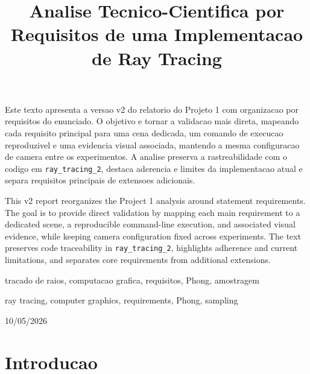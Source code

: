 \documentclass[portuguese]{sbcreviews-2025}%
\title[Analise por Requisitos do Projeto 1]{Analise Tecnico-Cientifica por Requisitos de uma Implementacao de Ray Tracing}
\author[Yang Ricardo Barcellos Miranda]{
\affil{\textbf{Yang Ricardo Barcellos Miranda}~[\href{mailto:ymiranda@inf.puc-rio.br}{\textit{ymiranda@inf.puc-rio.br}}]}
}
\begin{document}
\begin{frontmatter}

\maketitle

\begin{abstract-pt}
Este texto apresenta a versao v2 do relatorio do Projeto 1 com organizacao por requisitos do enunciado. O objetivo e tornar a validacao mais direta, mapeando cada requisito principal para uma cena dedicada, um comando de execucao reproduzivel e uma evidencia visual associada, mantendo a mesma configuracao de camera entre os experimentos. A analise preserva a rastreabilidade com o codigo em \texttt{ray\_tracing\_2}, destaca aderencia e limites da implementacao atual e separa requisitos principais de extensoes adicionais.
\end{abstract-pt}

\begin{abstract-en}
This v2 report reorganizes the Project 1 analysis around statement requirements. The goal is to provide direct validation by mapping each main requirement to a dedicated scene, a reproducible command-line execution, and associated visual evidence, while keeping camera configuration fixed across experiments. The text preserves code traceability in \texttt{ray\_tracing\_2}, highlights adherence and current limitations, and separates core requirements from additional extensions.
\end{abstract-en}

\begin{pchaves}
tracado de raios, computacao grafica, requisitos, Phong, amostragem
\end{pchaves}

\begin{keywords}
ray tracing, computer graphics, requirements, Phong, sampling
\end{keywords}

\begin{dates}
 10/05/2026
\end{dates}

\end{frontmatter}

\section{Introducao}
\label{sec:introducao-v2}
\end{document}
